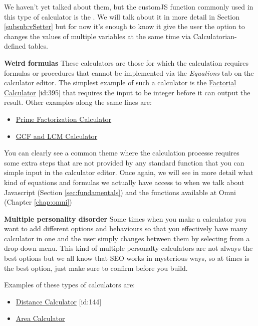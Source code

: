 We haven't yet talked about them, but the customJS function commonly used in this type of calculator is the . We will talk about it in more detail in Section \ref{subsub:vSetter} but for now it's enough to know it give the user the option to changes the values of multiple variables at the same time via Calculatorian-defined tables.

\textbf{Weird formulas}
\label{calc:weird}
These calculators are those for which the calculation requires formulas or procedures that cannot be implemented via the \textit{Equations} tab on the calculator editor. The simplest example of such a calculator is the \href{https://www.omnicalculator.com/all/factorial}{Factorial Calculator} [id:395] that requires the input to be integer before it can output the result. Other examples along the same lines are:
\begin{itemize}
    \item \href{https://www.omnicalculator.com/all/prime-factorization}{Prime Factorization Calculator}
    \item \href{https://www.omnicalculator.com/all/gcf-and-lcm}{GCF and LCM Calculator}
\end{itemize}

You can clearly see a common theme where the calculation processe requires some extra steps that are not provided by any standard function that you can simple input in the calculator editor. Once again, we will see in more detail what kind of equations and formulas we actually have access to when we talk about Javascript (Section \ref{sec:fundamentals}) and the functions available at Omni (Chapter \ref{chap:omni})

\textbf{Multiple personality disorder}
\label{calc:multiple}
Some times when you make a calculator you want to add different options and behaviours so that you effectively have many calculator in one and the user simply changes between them by selecting from a drop-down menu. This kind of multiple personalty calculators are not always the best options but we all know that SEO works in mysterious ways, so at times is the best option, just make sure to confirm before you build.

Examples of these types of calculators are:
\begin{itemize}
    \item \href{https://www.omnicalculator.com/all/distance}{Distance Calculator} [id:144]
    \item \href{https://www.omnicalculator.com/all/area}{Area Calculator}
\end{itemize}

